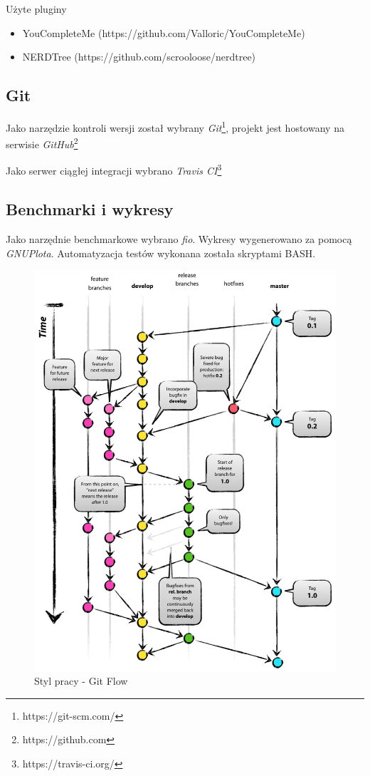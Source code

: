 Użyte pluginy
\begin{itemize}
\item YouCompleteMe (https://github.com/Valloric/YouCompleteMe)
\item NERDTree (https://github.com/scrooloose/nerdtree)
\end{itemize}

\subsection{Git}
Jako narzędzie kontroli wersji został wybrany \emph{Git}\footnote{https://git-scm.com/}, projekt
jest hostowany na serwisie \emph{GitHub}\footnote{https://github.com}

Jako serwer ciągłej integracji wybrano \emph{Travis CI}\footnote{https://travis-ci.org/}

\subsection{Benchmarki i wykresy}
Jako narzędnie benchmarkowe wybrano \textit{fio}. Wykresy wygenerowano za pomocą
 \textit{GNUPlota}. Automatyzacja testów wykonana została
skryptami BASH.

\begin{figure}[h!]
	\centering
	\includegraphics[scale=0.25]{gitflow.png}
		\caption{Styl pracy - Git Flow}
\end{figure}